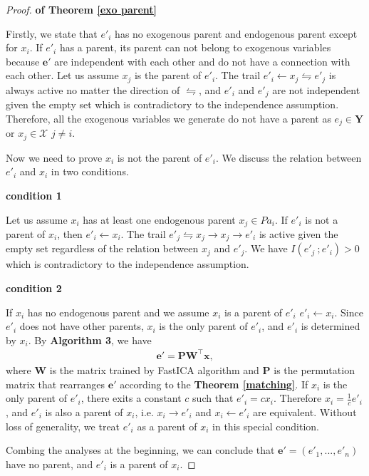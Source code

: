 \documentclass[twoside,11pt]{article}
\begin{document}
\begin{proof}{\textbf{of Theorem \ref{exo parent}}}

Firstly, we state that $e'_i$ has no exogenous parent and endogenous parent except for $x_i$. If $e'_i$ has a parent, its parent can not belong to exogenous variables because $\mathbf e'$ are independent with each other and do not have a connection with each other. Let us assume $x_j$ is the parent of $e'_i$. The trail $e'_i\gets x_j\leftrightharpoons e'_j$ is always active no matter the direction of $\leftrightharpoons$, and $e'_i$ and $e'_j$ are not independent given the empty set which is contradictory to the independence assumption. Therefore, all the exogenous variables we generate do not have a parent as $e_j\in\mathbf Y$ or $x_j\in\mathcal X$ $j\neq i$.

Now we need to prove $x_i$ is not the parent of $e'_i$. We discuss the relation between $e'_i$ and $x_i$ in two conditions.

\textbf{condition 1}

Let us assume $x_i$ has at least one endogenous parent $x_j\in Pa_i$. If $e'_i$ is not a parent of $x_i$, then $e'_i\gets x_i$. The trail $e'_j\leftrightharpoons x_j\to x_j\to e'_i$ is active given the empty set regardless of the relation between $x_j$ and $e'_j$. We have $I(e'_j\ ;e'_i)>0$ which is contradictory to the independence assumption.

\textbf{condition 2}

If $x_i$ has no endogenous parent and we assume $x_i$ is a parent of $e'_i$ $e'_i\gets x_i$. Since $e'_i$ does not have other parents, $x_i$ is the only parent of $e'_i$, and $e'_i$ is determined by $x_i$. By \textbf{Algorithm 3}, we have
\begin{align*}
\mathbf e'=\mathbf P\mathbf W^\top\mathbf x,
\end{align*}
where $\mathbf W$ is the matrix trained by FastICA algorithm and $\mathbf P$ is the permutation matrix that rearranges $\mathbf e'$ according to the \textbf{Theorem \ref{matching}}. If $x_i$ is the only parent of $e'_i$, there exits a constant $c$ such that $e'_i=cx_i$. Therefore $x_i=\frac1ce'_i$, and $e'_i$ is also a parent of $x_i$, i.e. $x_i\to e'_i$ and $x_i\gets e'_i$ are equivalent. Without loss of generality, we treat $e'_i$ as a parent of $x_i$ in this special condition.

Combing the analyses at the beginning, we can conclude that $\mathbf e'=(e'_1, ..., e'_n)$ have no parent, and $e'_i$ is a parent of $x_i$.
\end{proof}
\end{document}

